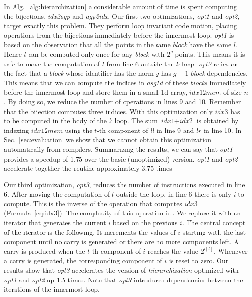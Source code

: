 In Alg.~\ref{alg:hierarchization} a considerable amount of time is spent computing the bijections, \textit{idx2agp} and \textit{agp2idx}. Our first two optimizations, \textit{opt1} and \textit{opt2}, target exactly this problem. They perform loop invariant code motion, placing operations from the bijections immediately before the innermost loop. \textit{opt1} is based on the observation that all the points in the same \textit{block} have the same $l$. Hence $l$ can be computed only once for any \textit{block} with $2^g$ points. This means it is safe to move the computation of $l$ from line 6 outside the $k$ loop. \textit{opt2} relies on the fact that a \textit{block} whose identifier has the norm $g$ has $g - 1$ \textit{block} dependencies. This means that we can compute the indices in \textit{asg1d} of these \textit{blocks} immediately before the innermost loop and store them in a small 1d array, $\textit{idx12mem}$ of size $n$. By doing so, we reduce the number of operations in lines 9 and 10. Remember that the bijection computes three indices. With this optimization only $\textit{idx3}$ has to be computed in the body of the $k$ loop. The sum $\textit{idx1} + \textit{idx2}$ is obtained by indexing $\textit{idx12mem}$ using the $t$-th component of $\textit{ll}$ in line 9 and $\textit{lr}$ in line 10. In Sec.~\ref{sec:evaluation} we show that we cannot obtain this optimization automatically from compilers. Summarizing the results, we can say that \textit{opt1} provides a speedup of 1.75 over the basic (unoptimized) version. \textit{opt1} and \textit{opt2} accelerate together the routine approximately 3.75 times.

Our third optimization, \textit{opt3}, reduces the number of instructions executed in line 6. After moving the computation of $l$ outside the loop, in line 6 there is only $i$ to compute. This is the inverse of the operation that computes $\textit{idx3}$ (Formula~\ref{eq:idx3}). The complexity of this operation is . We replace it with an iterator that generates the current $i$ based on the previous $i$. The central concept of the iterator is the following. It increments the values of $i$ starting with the last component until no carry is generated or there are no more components left. A carry is produced when the $t$-th component of $i$ reaches the value $2^{l[t]}$. Whenever a carry is generated, the corresponding component of $i$ is reset to zero. Our results show that \textit{opt3} accelerates the version of \textit{hierarchization} optimized with \textit{opt1} and \textit{opt2} up 1.5 times. Note that \textit{opt3} introduces dependencies between the iterations of the innermost loop.


